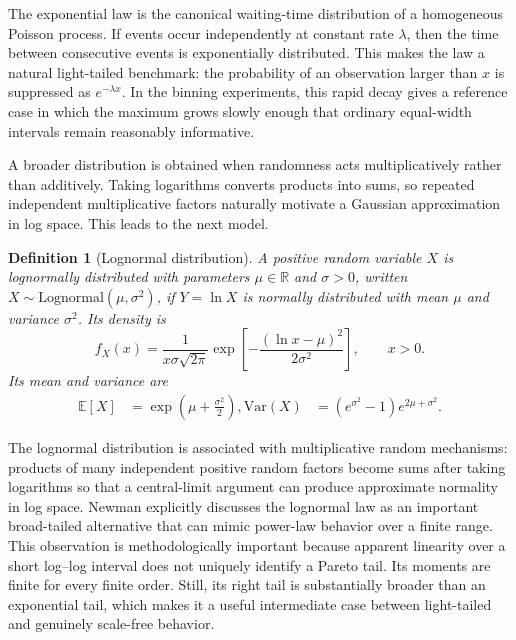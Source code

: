\documentclass[12pt]{article}
\def\\{ }%
\newcommand{\R}{\mathbb{R}}
\newtheorem{definition}{Definition}[section]
\numberwithin{equation}{section}
\begin{document}
The exponential law is the canonical waiting-time distribution of a homogeneous Poisson process. If events occur independently at constant rate $\lambda$, then the time between consecutive events is exponentially distributed. This makes the law a natural light-tailed benchmark: the probability of an observation larger than $x$ is suppressed as $e^{-\lambda x}$. In the binning experiments, this rapid decay gives a reference case in which the maximum grows slowly enough that ordinary equal-width intervals remain reasonably informative.

A broader distribution is obtained when randomness acts multiplicatively rather than additively. Taking logarithms converts products into sums, so repeated independent multiplicative factors naturally motivate a Gaussian approximation in log space. This leads to the next model.

\begin{definition}[Lognormal distribution]
A positive random variable $X$ is lognormally distributed with parameters $\mu\in\R$ and $\sigma>0$, written $X\sim\mathrm{Lognormal}(\mu,\sigma^2)$, if $Y=\ln X$ is normally distributed with mean $\mu$ and variance $\sigma^2$. Its density is
\begin{equation}
 f_X(x)=\frac{1}{x\sigma\sqrt{2\pi}}
 \exp\left[-\frac{(\ln x-\mu)^2}{2\sigma^2}\right],
 \qquad x>0.
\end{equation}
Its mean and variance are
\begin{align}
 \mathbb{E}[X] &= \exp\left(\mu+\frac{\sigma^2}{2}\right),\\
 \mathrm{Var}(X) &= \left(e^{\sigma^2}-1\right)e^{2\mu+\sigma^2}.
\end{align}
\end{definition}

The lognormal distribution is associated with multiplicative random mechanisms: products of many independent positive random factors become sums after taking logarithms so that a central-limit argument can produce approximate normality in log space. Newman \cite{Newman2005} explicitly discusses the lognormal law as an important broad-tailed alternative that can mimic power-law behavior over a finite range. This observation is methodologically important because apparent linearity over a short log--log interval does not uniquely identify a Pareto tail. Its moments are finite for every finite order. Still, its right tail is substantially broader than an exponential tail, which makes it a useful intermediate case between light-tailed and genuinely scale-free behavior.
\end{document}
